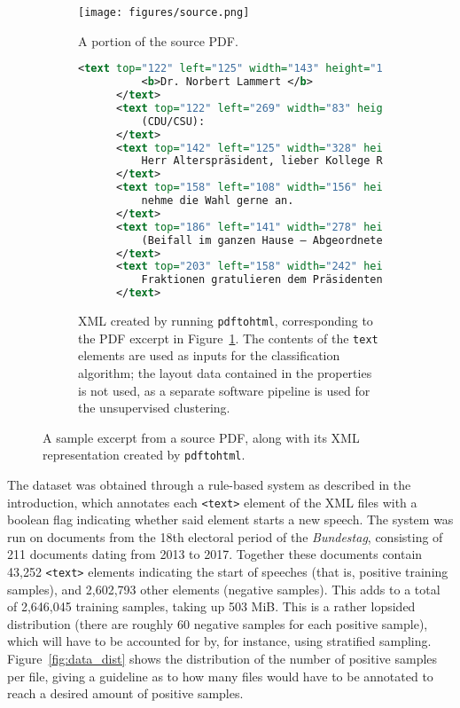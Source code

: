 \begin{figure}[htbp]
  \centering
  \begin{subfigure}[b]{0.6\textwidth} 
    \centering
    \texttt{[image: figures/source.png]}
    \caption{A portion of the source PDF.}
    \label{fig:source_pdf}
  \end{subfigure}
  \begin{subfigure}[b]{\textwidth}
	\centering
    \begin{lstlisting}[language=xml, morekeywords={text}]
      <text top="122" left="125" width="143" height="16" font="3">
          <b>Dr. Norbert Lammert </b>
      </text>
      <text top="122" left="269" width="83" height="17" font="4">
          (CDU/CSU):
      </text>
      <text top="142" left="125" width="328" height="17" font="4">
          Herr Alterspräsident, lieber Kollege Riesenhuber, ich
      </text>
      <text top="158" left="108" width="156" height="17" font="4">
          nehme die Wahl gerne an.
      </text>
      <text top="186" left="141" width="278" height="17" font="4">
          (Beifall im ganzen Hause – Abgeordnete aller
      </text>
      <text top="203" left="158" width="242" height="17" font="4">
          Fraktionen gratulieren dem Präsidenten)
      </text>
    \end{lstlisting}
    \caption{XML created by running \texttt{pdftohtml}, corresponding to the PDF
      excerpt in Figure~\ref{fig:source_pdf}. The contents of the \texttt{text}
      elements are used as inputs for the classification algorithm; the layout
      data contained in the properties is not used, as a separate software
      pipeline is used for the unsupervised clustering.}
    \label{fig:source_xml}
  \end{subfigure}
  \caption{A sample excerpt from a source PDF, along with its XML representation
    created by \texttt{pdftohtml}.}
  \label{fig:example}
\end{figure}

The dataset was obtained through a rule-based system as described in the
introduction, which annotates each \texttt{<text>} element of the XML files with
a boolean flag indicating whether said element starts a new speech. The system
was run on documents from the 18th electoral period of the \emph{Bundestag},
consisting of 211 documents dating from 2013 to 2017. Together these documents
contain 43,252 \texttt{<text>} elements indicating the start of speeches (that
is, positive training samples), and 2,602,793 other elements (negative samples).
This adds to a total of 2,646,045 training samples, taking up 503 MiB. This is a
rather lopsided distribution (there are roughly 60 negative samples for each
positive sample), which will have to be accounted for by, for instance, using
stratified sampling. Figure~\ref{fig:data_dist} shows the distribution of the
number of positive samples per file, giving a guideline as to how many files
would have to be annotated to reach a desired amount of positive samples.

